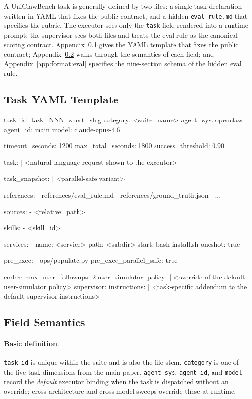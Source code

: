 
A UniClawBench task is generally defined by two files: a single task
declaration written in YAML that fixes the public contract, and a
hidden \texttt{eval\_rule.md} that specifies the rubric. The executor
sees only the \texttt{task} field rendered into a runtime prompt; the
supervisor sees both files and treats the eval rule as the canonical
scoring contract. Appendix~\ref{app:format:yaml} gives the YAML template that fixes
the public contract; Appendix~\ref{app:format:fields} walks through the
semantics of each field; and Appendix~\ref{app:format:eval} specifies the
nine-section schema of the hidden eval rule.

\subsection{Task YAML Template}\label{app:format:yaml}

\begin{clawcode}[title={Task YAML Template},label={lst:format:yaml}]
task_id: task_NNN_short_slug
category: <suite_name>
agent_sys: openclaw
agent_id: main
model: claude-opus-4.6

timeout_seconds: 1200
max_total_seconds: 1800
success_threshold: 0.90

task: |
  <natural-language request shown to the executor>

task_snapshot: |
  <parallel-safe variant>

references:
  - references/eval_rule.md
  - references/ground_truth.json
  - ...

sources:
  - <relative_path>

skills:
  - <skill_id>

services:
  - name: <service>
    path: <subdir>
    start: bash install.sh
    oneshot: true

pre_exec:
  - ops/populate.py
pre_exec_parallel_safe: true

codex:
  max_user_followups: 2
  user_simulator:
    policy: |
      <override of the default user-simulator policy>
  supervisor:
    instructions: |
      <task-specific addendum to the default supervisor instructions>
\end{clawcode}

\subsection{Field Semantics}\label{app:format:fields}

\paragraph{Basic definition.}
\texttt{task\_id} is unique within the suite and is also the file
stem. \texttt{category} is one of the five task dimensions from the main
paper. \texttt{agent\_sys}, \texttt{agent\_id}, and \texttt{model}
record the \emph{default} executor binding when the task is
dispatched without an override; cross-architecture and cross-model
sweeps override these at runtime.

